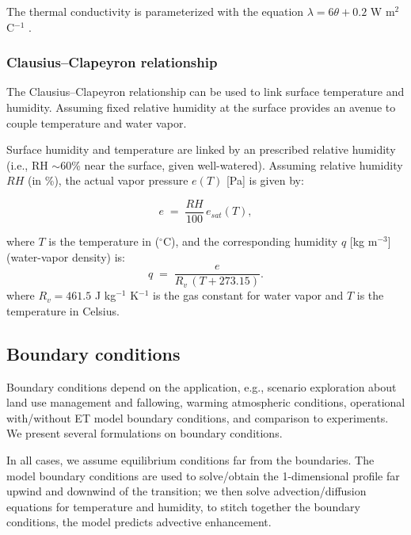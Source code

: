 \documentclass{article}
\begin{document}
    The thermal conductivity is parameterized with the equation $\lambda = 6 \theta + 0.2 $ W m$^2$ C$^{-1}$ \cite{xiong2023new}.
    
    \subsubsection{Clausius--Clapeyron relationship}
    
    The Clausius--Clapeyron relationship can be used to link surface temperature and humidity.
    Assuming fixed relative humidity at the surface provides an avenue to couple temperature and water vapor. 
    
    Surface humidity and temperature are linked by an prescribed relative humidity (i.e., RH  $\sim$60\% near the surface, given well-watered).  Assuming relative humidity $RH$ (in \%), the actual vapor pressure $e(T)$ [Pa] is given by:
    
    \begin{equation}
    e \;=\; \frac{RH}{100}\,e_{sat}(T),
    \end{equation}
    
    where  $T$ is the temperature in  ($^\circ$C), and the corresponding  humidity   $q$ [kg m$^{-3}$] (water-vapor density) is:
    \begin{equation}
    q \;=\; \frac{e}{R_v\, (T  +273.15)}.
    \end{equation}
    where $R_v = 461.5$ J kg$^{-1}$ K$^{-1}$ is the gas constant for water vapor and $T$ is the temperature in Celsius.
    
    
    \subsection{Boundary conditions }
    
    Boundary conditions depend on the application, e.g., scenario exploration about land use management and fallowing, warming atmospheric conditions, operational with/without ET model boundary conditions, and comparison to experiments.
    We present several formulations on boundary conditions.
    
    
     In all cases, we assume equilibrium conditions far from the boundaries. 
     The model boundary conditions are used to solve/obtain the 1-dimensional profile far upwind and downwind of the transition;  we then solve advection/diffusion equations for temperature and humidity, to stitch together the boundary conditions, the model predicts advective enhancement.
    
\end{document}
